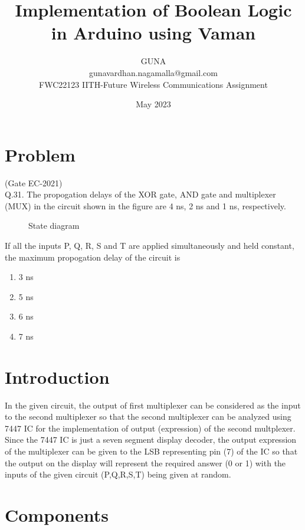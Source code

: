 \documentclass{article}
\title{Implementation of Boolean Logic in Arduino
using Vaman
}
\date{May 2023}
\author{GUNA\\gunavardhan.nagamalla@gmail.com\\ FWC22123 IITH-Future Wireless Communications Assignment}
\begin{document}
\maketitle
	\tableofcontents
	
	\pagebreak

\section{Problem} 
		(Gate EC-2021)\\
Q.31. The propogation delays of the XOR gate, AND gate and multiplexer (MUX) in the circuit shown in the figure are 4 ns, 2 ns and 1 ns, respectively.\\
\begin{figure}[h]
  
  \caption{State diagram}
  \label{fig:1}		
  \end{figure}

If all the inputs P, Q, R, S and T are applied simultaneously and held constant, the maximum propogation delay of the circuit is
\begin{enumerate}
	\item 3 ns \item 5 ns \item 6 ns \item 7 ns
\end{enumerate}
\section{Introduction}
		In the given circuit, the output of first multiplexer can be considered as the input to the second multiplexer so that the second multiplexer can be analyzed using 7447 IC for the implementation of output (expression) of the second multplexer. Since the 7447 IC is just a seven segment display decoder, the output expression of the multiplexer can be given to the LSB representing pin (7) of the IC so that the output on the display will represent the required answer (0 or 1) with the inputs of the given circuit (P,Q,R,S,T) being given at random.
\section{Components}

\begin{table}[h]
\centering

\end{table}

		
\end{document}
